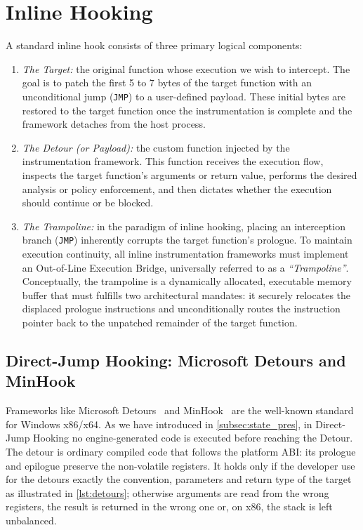 \section{Inline Hooking}
\label{sec:inline_hooking}

A standard inline hook consists of three primary logical components:
\begin{enumerate}
	\item \emph{The Target:} the original function whose execution we wish to intercept.
	The goal is to patch the first 5 to 7 bytes of the target function with an unconditional jump (\texttt{JMP}) to a user-defined payload.
	These initial bytes are restored to the target function once the instrumentation is complete and the framework detaches from the host process.
	\item \emph{The Detour (or Payload):} the custom function injected by the instrumentation framework.
	This function receives the execution flow, inspects the target function's arguments or return value, performs the desired analysis or policy enforcement, and then dictates whether the execution should continue or be blocked.
	\item \emph{The Trampoline:} in the paradigm of inline hooking, placing an interception branch (\texttt{JMP}) inherently corrupts the target function's prologue.
	To maintain execution continuity, all inline instrumentation frameworks must implement an Out-of-Line Execution Bridge, universally referred to as a \emph{``Trampoline''}.
	Conceptually, the trampoline is a dynamically allocated, executable memory buffer that must fulfills two architectural mandates: it securely relocates the displaced prologue instructions and unconditionally routes the instruction pointer back to the unpatched remainder of the target function.
\end{enumerate}

\subsection{Direct-Jump Hooking: Microsoft Detours and MinHook}
\label{subsec:bare_metal_hooking}
Frameworks like Microsoft Detours~\cite{DBLP:conf/usenix-nt/HuntB99} and MinHook~\cite{repo:minhook} are the well-known standard for Windows x86/x64.
As we have introduced in \cref{subsec:state_pres}, in Direct-Jump Hooking no engine-generated code is executed before reaching the Detour.
The detour is ordinary compiled code that follows the platform \ac{ABI}: its prologue and epilogue preserve the non-volatile registers. It holds only if the developer use for the detours exactly the convention, parameters and return type of the target as illustrated in \cref{lst:detours}; otherwise arguments are read from the wrong registers, the result is returned in the wrong one or, on x86, the stack is left unbalanced.

